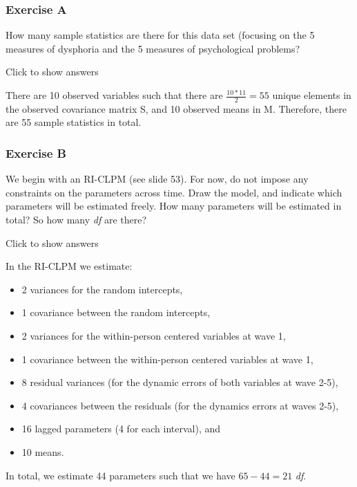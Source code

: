 \documentclass[
]{book}
\providecommand{\tightlist}{%
  \setlength{\itemsep}{0pt}\setlength{\parskip}{0pt}}
\begin{document}
\hypertarget{exercise-a-1}{%
\subsubsection*{Exercise A}\label{exercise-a-1}}

How many sample statistics are there for this data set (focusing on the 5 measures of dysphoria and the 5 measures of psychological problems?

Click to show answers

There are 10 observed variables such that there are \(\frac{10*11}{2} = 55\) unique elements in the observed covariance matrix S, and 10 observed means in M. Therefore, there are 55 sample statistics in total.

\hypertarget{exercise-b-1}{%
\subsubsection*{Exercise B}\label{exercise-b-1}}

We begin with an RI-CLPM (see slide 53). For now, do not impose any constraints on the parameters across time. Draw the model, and indicate which parameters will be estimated freely. How many parameters will be estimated in total? So how many \emph{df} are there?

Click to show answers

In the RI-CLPM we estimate:

\begin{itemize}
\tightlist
\item
  2 variances for the random intercepts,
\item
  1 covariance between the random intercepts,
\item
  2 variances for the within-person centered variables at wave 1,
\item
  1 covariance between the within-person centered variables at wave 1,
\item
  8 residual variances (for the dynamic errors of both variables at wave 2-5),
\item
  4 covariances between the residuals (for the dynamics errors at waves 2-5),
\item
  16 lagged parameters (4 for each interval), and
\item
  10 means.
\end{itemize}

In total, we estimate 44 parameters such that we have \(65 - 44 = 21\) \emph{df}.
\end{document}
